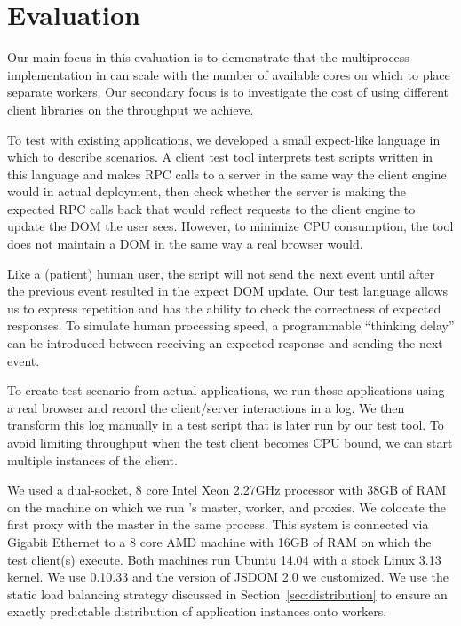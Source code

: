 \section{Evaluation}
\label{sec:eval}

Our main focus in this evaluation is to demonstrate that the multiprocess implementation
in \cbtwo can scale with the number of available cores on which to place separate workers.
Our secondary focus is to investigate the cost of using different client libraries on 
the throughput we achieve.

To test \cbtwo with existing applications, we developed a small expect-like language 
in which to describe scenarios. A client test tool interprets test scripts written in
this language and makes RPC calls to a server in the same way the client engine would
in actual deployment, then check whether the server is making the expected RPC
calls back that would reflect requests to the client engine to update the DOM the
user sees.  
However, to minimize CPU consumption, the tool does not maintain a DOM in the same
way a real browser would.

Like a (patient) human user, the script will not send the next event until after the
previous event resulted in the expect DOM update.  
Our test language allows us to express repetition and has the ability to check
the correctness of expected responses.  
To simulate human processing speed, a programmable ``thinking delay'' can be introduced 
between receiving an expected response and sending the next event.

To create test scenario from actual applications,
we run those applications using a real browser and record the client/server interactions
in a log.  We then transform this log manually in a test script that is later run 
by our test tool.  To avoid limiting throughput when the test client becomes CPU bound,
we can start multiple instances of the client.

We used a dual-socket, 8 core Intel Xeon 2.27GHz processor with 38GB of RAM on the machine
on which we run \cbtwo{}'s master, worker, and proxies.  We colocate the first proxy with
the master in the same process.
This system is connected via Gigabit Ethernet to a 8 core AMD
machine with 16GB of RAM on which the test client(s) execute. Both machines run 
Ubuntu 14.04 with a stock Linux 3.13 kernel.  We use \nodejs{} 0.10.33 and the version
of JSDOM 2.0 we customized.  We use the static load balancing strategy discussed in 
Section~\ref{sec:distribution} to ensure an exactly predictable distribution of application
instances onto workers.

